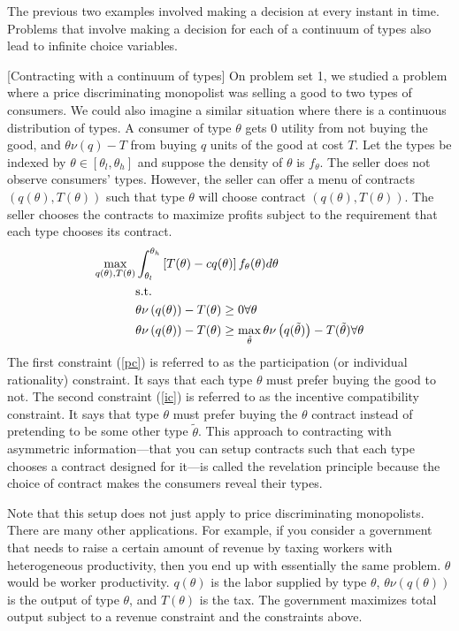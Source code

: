 The previous two examples involved making a decision at every instant
in time. Problems that involve making a decision for each of a
continuum of types also lead to infinite choice variables.
\begin{example}\label{ex:contract}[Contracting with a continuum of
  types]
  On problem set 1, we studied a problem where a price discriminating
  monopolist was selling a good to two types of consumers. We could
  also imagine a similar situation where there is a continuous
  distribution of types. A consumer of type $\theta$ gets $0$ utility
  from not buying the good, and $\theta \nu(q) - T$ from buying $q$
  units of the good at cost $T$. Let the types be indexed by $\theta \in
  [\theta_l,\theta_h]$ and suppose the density of $\theta$ is $f_\theta$. The
  seller does not observe consumers' types. However, the seller can
  offer a menu of contracts $(q(\theta),T(\theta))$ such that type
  $\theta$ will choose contract $(q(\theta),T(\theta))$. The seller
  chooses the contracts to maximize profits subject to the requirement
  that each type chooses its contract.
  \begin{align}
    \max_{q(\theta),T(\theta)} & \int_{\theta_l}^{\theta_h} 
    \left[T(\theta) - cq(\theta)\right]
    f_\theta(\theta) d\theta \notag \\
    & \text{s.t.} \notag \\
    &\theta \nu\left(q(\theta)\right) - T(\theta) \geq 0  \forall
    \theta \label{pc} \\
    &\theta \nu\left(q(\theta)\right) - T(\theta) \geq
    \max_{\tilde{\theta}} \theta \nu\left(q(\tilde{\theta}) \right) -
    T(\tilde{\theta}) \forall \theta \label{ic} 
  \end{align}
  The first constraint (\ref{pc}) is referred to as the participation
  (or individual rationality)
  constraint. It says that each type $\theta$ must prefer buying the
  good to not. The second constraint  (\ref{ic}) is referred to as the
  incentive compatibility constraint. It says that type $\theta$ must
  prefer buying the $\theta$ contract instead of pretending to be
  some other type $\tilde{\theta}$. This approach to contracting with
  asymmetric information---that you can setup contracts such that each
  type chooses a contract designed for it---is called the revelation
  principle because the choice of contract makes the consumers reveal
  their types. 
  
  Note that this setup does not just apply to price discriminating
  monopolists. There are many other applications. For example, if you
  consider a government that needs to raise a certain amount of
  revenue by taxing workers with heterogeneous productivity, then you
  end up with essentially the same problem. $\theta$ would be worker
  productivity. $q(\theta)$ is the labor supplied by type $\theta$,
  $\theta \nu(q(\theta))$ is the output of type $\theta$, and
  $T(\theta)$ is the tax. The government maximizes total output
  subject to a revenue constraint and the constraints above.  
\end{example}

